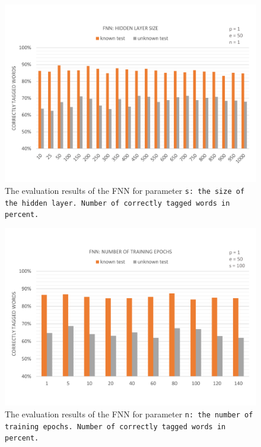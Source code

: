 \begin{figure}[H]
	\includegraphics[width=\textwidth]{images/evaluation_fnn_s}
	\caption[FNN Evaluation: Hidden Layer Size]{The evaluation results of the FNN for parameter \tt{s}: the size of the hidden layer. Number of correctly tagged words in percent.}
	\label{f.evaluation.fnn.s}
\end{figure}

\begin{figure}[H]
	\includegraphics[width=\textwidth]{images/evaluation_fnn_n}
	\caption[FNN Evaluation: Number of Training Epochs]{The evaluation results of the FNN for parameter \tt{n}: the number of training epochs. Number of correctly tagged words in percent.}
	\label{f.evaluation.fnn.n}
\end{figure}

